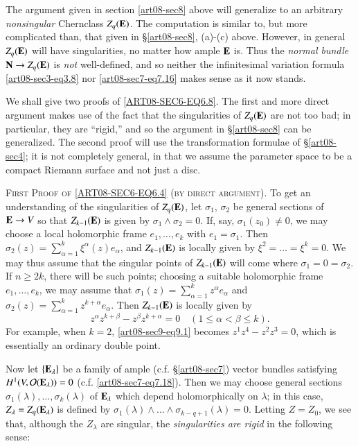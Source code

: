 The argument given in section \ref{art08-sec8} above will generalize to an arbitrary {\em nonsingular} Chern\pageoriginale class $Z_{q}(\mathbf{E})$. The computation is similar to, but more complicated than, that given in \S\ref{art08-sec8}, (a)-(c) above. However, in general $Z_{q}(\mathbf{E})$ will have singularities, no matter how ample $\mathbf{E}$ is. Thus the {\em normal bundle} $\mathbf{N}\to Z_{q}(\mathbf{E})$ is {\em not} well-defined, and so neither the infinitesimal variation formula \eqref{art08-sec3-eq3.8} nor \eqref{art08-sec7-eq7.16} makes sense as it now stands.

We shall give two proofs of \eqref{ART08-SEC6-EQ6.8}. The first and more direct argument makes use of the fact that the singularities of $Z_{q}(\mathbf{E})$ are not too bad; in particular, they are ``rigid,'' and so the argument in \S\ref{art08-sec8} can be generalized. The second proof will use the transformation formulae of \S\ref{art08-sec4}; it is not completely general, in that we assume the parameter space to be a compact Riemann surface and not just a disc.

\medskip
\textsc{First Proof of \eqref{ART08-SEC6-EQ6.4} (by direct argument).} To get an understanding of the singularities of $Z_{q}(\mathbf{E})$, let $\sigma_{1}$, $\sigma_{2}$ be general sections of $\mathbf{E}\to V$ so that $Z_{k-1}(\mathbf{E})$ is given by $\sigma_{1}\wedge \sigma_{2}=0$. If, say, $\sigma_{1}(z_{0})\neq 0$, we may choose a local holomorphic frame $e_{1},\ldots,e_{k}$ with $e_{1}=\sigma_{1}$. Then $\sigma_{2}(z)=\sum\limits^{k}_{\alpha=1}\xi^{\alpha}(z)e_{\alpha}$, and $Z_{k-1}(\mathbf{E})$ is locally given by $\xi^{2}=\ldots=\xi^{k}=0$. We may thus assume that the singular points of $Z_{k-1}(\mathbf{E})$ will come where $\sigma_{1}=0=\sigma_{2}$. If $n\geq 2k$, there will be such points; choosing a suitable holomorphic frame $e_{1},\ldots,e_{k}$, we may assume that $\sigma_{1}(z)=\sum\limits^{k}_{\alpha=1}z^{\alpha}e_{\alpha}$ and $\sigma_{2}(z)=\sum\limits^{k}_{\alpha=1}z^{k+\alpha}e_{\alpha}$. Then $Z_{k-1}(\mathbf{E})$ is locally given by
\begin{equation*}
z^{\alpha}z^{k+\beta}-z^{\beta}z^{k+\alpha}=0\quad (1\leq \alpha<\beta \leq k).\tag{9.1}\label{art08-sec9-eq9.1}
\end{equation*}
For example, when $k=2$, \eqref{art08-sec9-eq9.1} becomes $z^{1}z^{4}-z^{2}z^{3}=0$, which is essentially an ordinary double point.

Now let $\{\mathbf{E}_{\lambda}\}$ be a family of ample (c.f. \S\ref{art08-sec7}) vector bundles satisfying $H^{1}(V,\mathcal{O}(\mathbf{E}_{\lambda}))=0$ (c.f. \eqref{art08-sec7-eq7.18}). Then we may choose general sections $\sigma_{1}(\lambda),\ldots,\sigma_{k}(\lambda)$ of $\mathbf{E}_{\lambda}$ which depend holomorphically on $\lambda$; in this case, $Z_{\lambda}=Z_{q}(\mathbf{E}_{\lambda})$ is defined by $\sigma_{1}(\lambda)\wedge\ldots\wedge \sigma_{k-q+1}(\lambda)=0$. Letting $Z=Z_{0}$, we see that, although the $Z_{\lambda}$ are singular, the {\em singularities are rigid} in the following sense:

